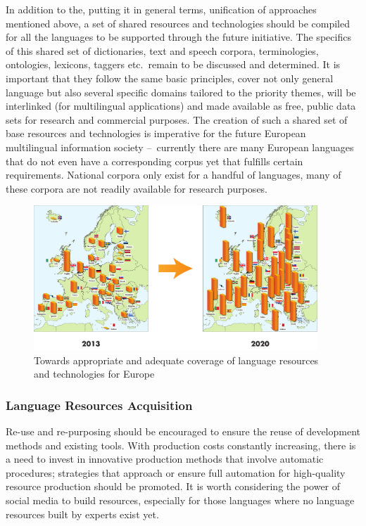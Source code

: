 \documentclass[10pt, plain]{../../metanetpaper}
\begin{document}
\begin{multicols}{2}
In addition to the, putting it in general terms, unification of approaches mentioned above, a set of shared resources and technologies should be compiled for all the languages to be supported through the future initiative. The specifics of this shared set of dictionaries, text and speech corpora, terminologies, ontologies, lexicons, taggers etc.~remain to be discussed and determined. It is important that they follow the same basic principles, cover not only general language but also several specific domains tailored to the priority themes, will be interlinked (for multilingual applications) and made available as free, public data sets for research and commercial purposes. The creation of such a shared set of base resources and technologies is imperative for the future European multilingual information society --~currently there are many European languages that do not even have a corresponding corpus yet that fulfills certain requirements. National corpora only exist for a handful of languages, many of these corpora are not readily available for research purposes. 

\begin{figure}[htb]
  \center
  \includegraphics[width=0.95\textwidth]{../_media/europeImproveLT}
  \caption{Towards appropriate and adequate coverage of language resources and technologies for Europe}
  \label{fig:lr-lt-coverage}
\end{figure}

\subsubsection{Language Resources Acquisition}
\label{sec:lang-reso-acqu}

Re-use and re-purposing should be encouraged to ensure the reuse of development methods and existing tools. With production costs constantly increasing, there is a need to invest in innovative production methods that involve automatic procedures; strategies that approach or ensure full automation for high-quality resource production should be promoted. It is worth considering the power of social media to build resources, especially for those languages where no language resources built by experts exist yet.


\end{multicols}
\end{document}
